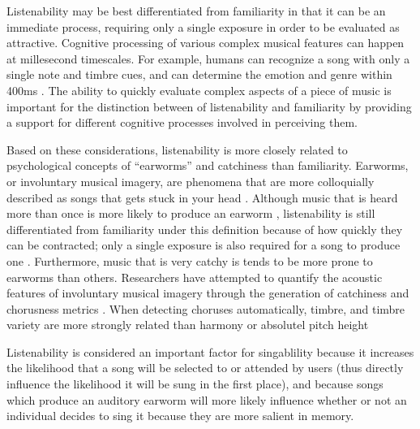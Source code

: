 Listenability may be best differentiated from familiarity in that it can be an immediate process, requiring only a single exposure in order to be evaluated as attractive. Cognitive processing of various complex musical features can happen at millesecond timescales. For example, humans can recognize a song with only a single note and timbre cues, and can determine the emotion and genre within 400ms \cite{krumhansl2010plink}. The ability to quickly evaluate complex aspects of a piece of music is important for the distinction between of listenability and familiarity by providing a support for different cognitive processes involved in perceiving them.

Based on these considerations, listenability is more closely related to psychological concepts of ``earworms''\cite{wallin2001origins} and catchiness than familiarity. Earworms, or involuntary musical imagery, are phenomena that are more colloquially described as songs that gets stuck in your head \cite{williamson2012earworms}. Although music that is heard more than once is more likely to produce an earworm \cite{byron2015repetition}, listenability is still differentiated from familiarity under this definition because of how quickly they can be contracted; only a single exposure is also required for a song to produce one \cite{meyer1903experimental}. Furthermore, music that is very catchy is tends to be more prone to earworms than others. Researchers have attempted to quantify the acoustic features of involuntary musical imagery through the generation of catchiness and chorusness metrics \cite{Burgoyne2013,Gao2015}. When detecting choruses automatically, timbre, and timbre variety are more strongly related than harmony or absolutel pitch height \cite{VanBalen2013}

Listenability is considered an important factor for singablility because it increases the likelihood that a song will be selected to or attended by users (thus directly influence the likelihood it will be sung in the first place), and because songs which produce an auditory earworm will more likely influence whether or not an individual decides to sing it because they are more salient in memory.

